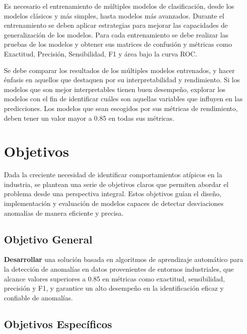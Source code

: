 \documentclass[11pt,a4paper,spanish]{book}
\numberwithin{equation}{chapter}
\numberwithin{figure}{chapter}
\begin{document}
Es necesario el entrenamiento de múltiples modelos de clasificación, desde los modelos 
clásicos y más simples, hasta modelos más avanzados. Durante el entrenamiento se deben 
aplicar estrategias para mejorar las capacidades de generalización de los modelos. 
Para cada entrenamiento se debe realizar las pruebas de los modelos y obtener sus 
matrices de confusión y métricas como  Exactitud, Precisión, Sensibilidad, F1 y 
área bajo la curva ROC.


Se debe comparar los resultados de los múltiples modelos entrenados, y hacer énfasis en 
aquellos que destaquen por su interpretabilidad y rendimiento. Si los modelos que son 
mejor interpretables tienen buen desempeño, explorar los modelos con el fin de 
identificar cuáles son aquellas variables que influyen en las predicciones. 
Los modelos que sean escogidos por sus métricas de rendimiento, deben tener un valor 
mayor a 0.85 en todas sus métricas. 


\chapter{Objetivos}

Dada la creciente necesidad de identificar comportamientos atípicos en la industria, 
se plantean una serie de objetivos claros que permiten abordar el problema desde una 
perspectiva integral. 
Estos objetivos guían el diseño, implementación y evaluación de modelos capaces de 
detectar desviaciones anomalías de manera eficiente y precisa.


\section{Objetivo General}

\textbf{Desarrollar} una solución basada en algoritmos de aprendizaje automático para 
la detección de anomalías en datos provenientes de entornos industriales, 
que alcance valores superiores a 0.85 en métricas como exactitud, sensibilidad, 
precisión y F1, y garantice un alto desempeño en la identificación eficaz y 
confiable de anomalías.

\section{Objetivos Específicos}
\end{document}
